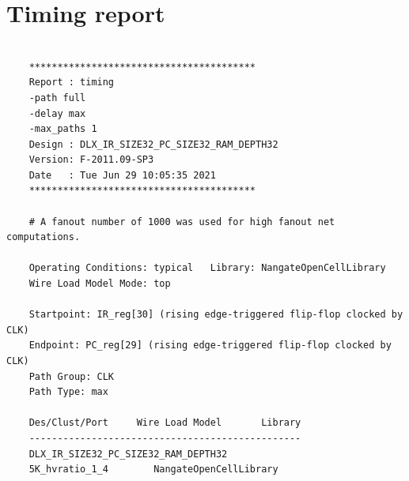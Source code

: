\section{Timing report}
\begin{lstlisting}
	 
	****************************************
	Report : timing
	-path full
	-delay max
	-max_paths 1
	Design : DLX_IR_SIZE32_PC_SIZE32_RAM_DEPTH32
	Version: F-2011.09-SP3
	Date   : Tue Jun 29 10:05:35 2021
	****************************************
	
	# A fanout number of 1000 was used for high fanout net computations.
	
	Operating Conditions: typical   Library: NangateOpenCellLibrary
	Wire Load Model Mode: top
	
	Startpoint: IR_reg[30] (rising edge-triggered flip-flop clocked by CLK)
	Endpoint: PC_reg[29] (rising edge-triggered flip-flop clocked by CLK)
	Path Group: CLK
	Path Type: max
	
	Des/Clust/Port     Wire Load Model       Library
	------------------------------------------------
	DLX_IR_SIZE32_PC_SIZE32_RAM_DEPTH32
	5K_hvratio_1_4        NangateOpenCellLibrary
	

\end{lstlisting}
